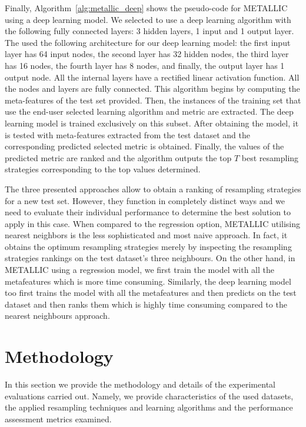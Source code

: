 \documentclass{article}
\begin{document}
Finally, Algorithm~\autoref{alg:metallic_deep} shows the pseudo-code for METALLIC using a deep learning model. We selected to use a deep learning algorithm with the following fully connected layers: 3 hidden layers, 1 input and 1 output layer. The used the following architecture for our deep learning model: the first input layer has 64 input nodes, the second layer has 32 hidden nodes, the third layer has 16 nodes, the fourth layer has 8 nodes, and finally, the output layer has 1 output node. All the internal layers have a rectified linear activation function. %
All the nodes and layers are fully connected. This algorithm begins by computing the meta-features of the test set provided. Then, the instances of the training set that use the end-user selected learning algorithm and metric are extracted. The deep learning model is trained exclusively on this subset. After obtaining the model, it is tested with meta-features extracted from the test dataset and the corresponding predicted selected metric is obtained. Finally, the values of the predicted metric are ranked and the algorithm outputs the top $T$ best resampling strategies corresponding to the top values determined.

The three presented approaches allow to obtain a ranking of resampling strategies for a new test set. However, they function in completely distinct ways and we need to evaluate their individual performance to determine the best solution to apply in this case. When compared to the regression option, METALLIC utilising nearest neighbors is the less sophisticated and most naive approach. In fact, it obtains the optimum resampling strategies merely by inspecting the resampling strategies rankings on the test dataset's three neighbours. On the other hand, in METALLIC using a regression model, we first train the model with all the metafeatures which is more time consuming. Similarly, the deep learning model too first trains the model with all the metafeatures and then predicts on the test dataset and then ranks them which is highly time consuming compared to the nearest neighbours approach. 


\section{Methodology}\label{sec:methodology}
In this section we provide the methodology and details of the  experimental evaluations carried out. Namely, we provide characteristics of the used datasets, the applied resampling techniques and learning algorithms and the performance assessment metrics examined.  
\end{document}
